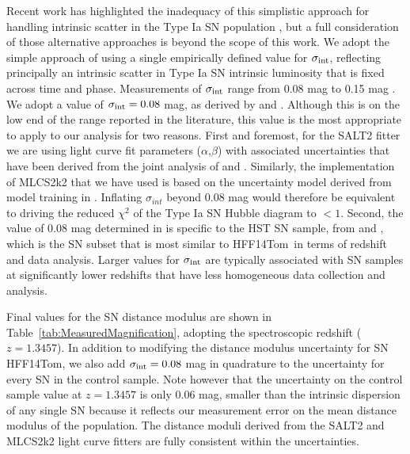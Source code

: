 \documentclass[iop]{emulateapj}
\def\tomas{HFF14Tom}
\begin{document}
Recent work has highlighted the inadequacy of this simplistic approach
for handling intrinsic scatter in the Type Ia SN
population \citep{Marriner:2011,Kessler:2013,Mosher:2014,Scolnic:2014a,Betoule:2014},
but a full consideration of those alternative approaches is beyond the
scope of this work.  We adopt the simple approach of using a single
empirically defined value for $\sigma_{\rm int}$, reflecting
principally an intrinsic scatter in Type Ia SN intrinsic luminosity
that is fixed across time and phase.  Measurements of $\sigma_{\rm
int}$ range from 0.08 mag \citep{Jha:2007,Conley:2011} to 0.15
mag \citep{Kessler:2009b,Suzuki:2012}.  We adopt a value of
$\sigma_{\rm int}=0.08$ mag, as derived by \citet{Jha:2007}
and \citet{Conley:2011}.  Although this is on the low end of the range
reported in the literature, this value is the most appropriate to
apply to our analysis for two reasons.  First and foremost, for the
SALT2 fitter we are using light curve fit parameters
($\alpha$,$\beta$) with associated uncertainties that have been
derived from the joint analysis of \citet{Conley:2011}
and \citet{Sullivan:2011}. Similarly, the implementation of MLCS2k2
that we have used is based on the uncertainty model derived from model
training in \citet{Jha:2007}.  Inflating $\sigma_{int}$ beyond 0.08
mag would therefore be equivalent to driving the reduced $\chi^2$ of
the Type Ia SN Hubble diagram to $<1$.  Second, the value of 0.08 mag
determined in \citet{Conley:2011} is specific to the HST SN sample,
from \citet{Riess:2007} and \citet{Suzuki:2012}, which is the SN
subset that is most similar to \tomas\ in terms of redshift and data
analysis.  Larger values for $\sigma_{\rm int}$ are typically
associated with SN samples at significantly lower redshifts that have
less homogeneous data collection and analysis. 

Final values for the SN distance modulus are shown in
Table~\ref{tab:MeasuredMagnification}, adopting the spectroscopic
redshift ($z=1.3457$).  In addition to modifying the distance modulus
uncertainty for SN \tomas, we also add $\sigma_{\rm int}=0.08$ mag in
quadrature to the uncertainty for every SN in the control sample. Note
however that the uncertainty on the control sample value at $z=1.3457$
is only 0.06 mag, smaller than the intrinsic dispersion of
any single SN because it reflects our measurement error on the mean
distance modulus of the population.  The distance moduli derived from
the SALT2 and MLCS2k2 light curve fitters are fully consistent within
the uncertainties. 
\end{document}
